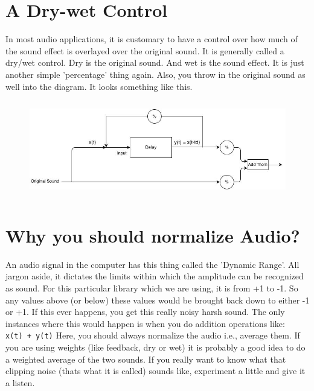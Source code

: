 \documentclass{article}
\begin{document}
\section*{A Dry-wet Control}
In most audio applications, it is customary to have a control over how much of 
the sound effect is overlayed over the original sound. It is generally called a 
dry/wet control. Dry is the original sound. And wet is the sound effect.
It is just another simple 'percentage' thing again. Also, you throw in the original 
sound as well into the diagram. It looks something like this.
\begin{figure}[h]
\begin{center}
\includegraphics[height=120pt]{../pictures/image6.jpg}
\end{center}
\end{figure}
\section*{Why you should normalize Audio?}
An audio signal in the computer has this thing called the 'Dynamic Range'. 
All jargon aside, it dictates the limits within which the amplitude can be 
recognized as sound. For this particular library which we are using, it is from 
+1 to -1. So any values above (or below) these values would be brought back down 
to either -1 or +1. If this ever happens, you get this really noisy harsh sound. 
The only instances where this would happen is when you do addition operations like:
\newline \\ \texttt{x(t) + y(t)} 
Here, you should always normalize the audio i.e., average them. If you are using 
weights (like feedback, dry or wet) it is probably a good idea to do a weighted
average of the two sounds.
If you really want to know what that clipping noise (thats what it is called) 
sounds like, experiment a little and give it a listen. 
\end{document}

